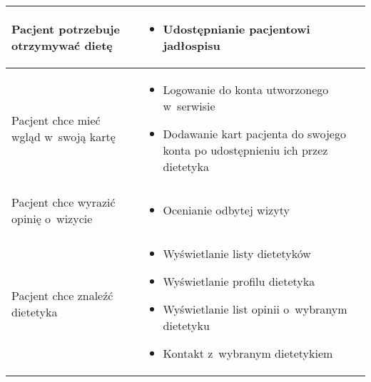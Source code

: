 \begin{minipage}{\textwidth}
\begin{table}[H]
\begin{tabular}{|P{.3\textwidth}|P{.6\textwidth}|}
            \hline
            Pacjent potrzebuje otrzymywać dietę &
            \begin{itemize}
                \item Udostępnianie pacjentowi jadłospisu
            \end{itemize} \\
            \hline
            Pacjent chce mieć wgląd w~swoją kartę &
            \begin{itemize}
                \item Logowanie do konta utworzonego w~serwisie
                \item Dodawanie kart pacjenta do swojego konta po udostępnieniu ich przez dietetyka
            \end{itemize} \\
            \hline
            Pacjent chce wyrazić opinię o~wizycie &
            \begin{itemize}
                \item Ocenianie odbytej wizyty
            \end{itemize} \\
            \hline
            Pacjent chce znaleźć dietetyka &
            \begin{itemize}
                \item Wyświetlanie listy dietetyków
                \item Wyświetlanie profilu dietetyka
                \item Wyświetlanie list opinii o~wybranym dietetyku
                \item Kontakt z~wybranym dietetykiem
            \end{itemize} \\
            \hline
        \end{tabular}
    \end{table}
\end{minipage}

\newpage

